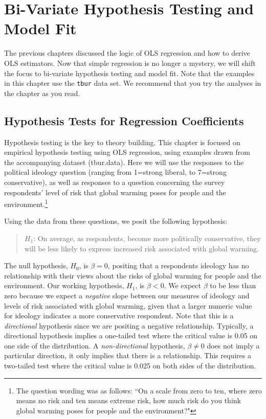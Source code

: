 \documentclass[11pt,openany]{book}\usepackage[]{graphicx}\usepackage[]{color}
\begin{document}
{\chapter{Bi-Variate Hypothesis Testing and Model Fit}

The previous chapters discussed the logic of OLS regression and how to derive OLS estimators. Now that simple regression is no longer a mystery, we will shift the focus to bi-variate hypothesis testing and model fit. Note that the examples in this chapter use the \texttt{tbur} data set.  We recommend that you try the analyses in the chapter as you read.

\section{Hypothesis Tests for Regression Coefficients}

Hypothesis testing is the key to theory building. This chapter is focused on empirical hypothesis testing using OLS regression, using examples drawn from the accompanying dataset (tbur.data). Here we will use the responses to the political ideology question  (ranging from 1=strong liberal, to 7=strong conservative), as well as responses to a question concerning the survey respondents' level of risk that global warming poses for people and the environment.\footnote{The question wording was as follows: ``On a scale from zero to ten, where zero
means no risk and ten means extreme risk, how much
risk do you think global warming poses for people
and the environment?"}

Using the data from these questions, we posit the following hypothesis:
\begin{quote}
$H_{1}$: On average, as respondents, become more politically conservative, they will be less likely to express increased risk associated with global warming.
\end{quote}

The null hypothesis, $H_{0}$, is $\beta = 0$, positing that a respondents ideology has no relationship with their views about the risks of global warming for people and the environment. Our working hypothesis, $H_{1}$, is $\beta < 0$. We expect $\beta$ to be less than zero because we expect a \textit{negative} slope between our measures of ideology and levels of risk associated with global warming, given that a larger numeric value for ideology indicates a more conservative respondent. Note that this is a \textit{directional} hypothesis since we are positing a negative relationship. Typically, a directional hypothesis implies a one-tailed test where the critical value is 0.05 on one side of the distribution. A \textit{non-directional} hypothesis, $\beta \neq 0$ does not imply a particular direction, it only implies that there is a relationship. This requires a two-tailed test where the critical value is 0.025 on both sides of the distribution.  

}
\end{document}
